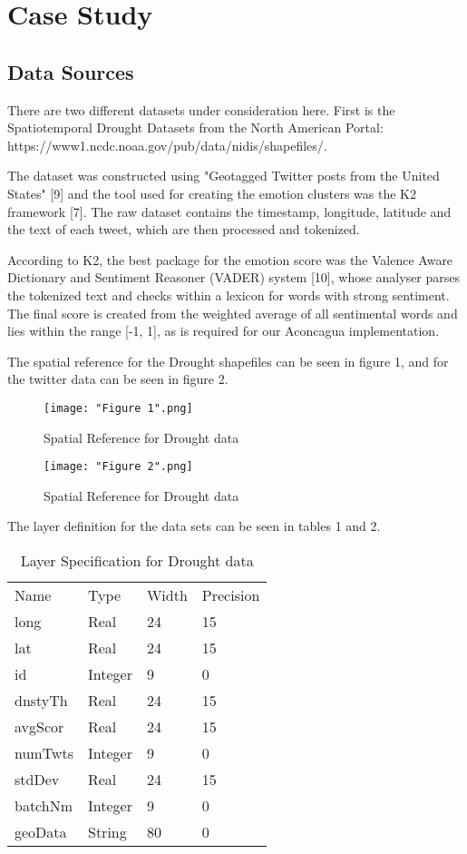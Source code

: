 \documentclass[conference]{IEEEtran}
\begin{document}
\section{Case Study}

\subsection{Data Sources}

There are two different datasets under consideration here. First is the Spatiotemporal Drought Datasets from the North American Portal: https://www1.ncdc.noaa.gov/pub/data/nidis/shapefiles/.

The dataset was constructed using "Geotagged Twitter posts from the United States" [9] and the tool used for creating the emotion clusters was the K2 framework [7]. The raw dataset contains the timestamp, longitude, latitude and the text of each tweet, which are then processed and tokenized.

According to K2, the best package for the emotion score was the Valence Aware Dictionary and Sentiment Reasoner (VADER) system [10], whose analyser parses the tokenized text and checks within a lexicon for words with strong sentiment. The final score is created from the weighted average of all sentimental words and lies within the range [-1, 1], as is required for our Aconcagua implementation.

The spatial reference for the Drought shapefiles can be seen in figure 1, and for the twitter data can be seen in figure 2. 

\begin{figure}[ht]
\centerline{\texttt{[image: "Figure 1".png]}}
\caption{Spatial Reference for Drought data}
\label{Figure 1}
\end{figure}

\begin{figure}[ht]
\centerline{\texttt{[image: "Figure 2".png]}}
\caption{Spatial Reference for Drought data}
\label{Figure 2}
\end{figure}

The layer definition for the data sets can be seen in tables 1 and 2.

\begin{table}[]
\caption{Layer Specification for Drought data}
\label{Table 1}
\centering
\begin{tabular}{llll}
Name    & Type    & Width & Precision \\
long    & Real    & 24    & 15        \\
lat     & Real    & 24    & 15        \\
id      & Integer & 9     & 0         \\
dnstyTh & Real    & 24    & 15        \\
avgScor & Real    & 24    & 15        \\
numTwts & Integer & 9     & 0         \\
stdDev  & Real    & 24    & 15        \\
batchNm & Integer & 9     & 0         \\
geoData & String  & 80    & 0        
\end{tabular}
\end{table}
\end{document}
